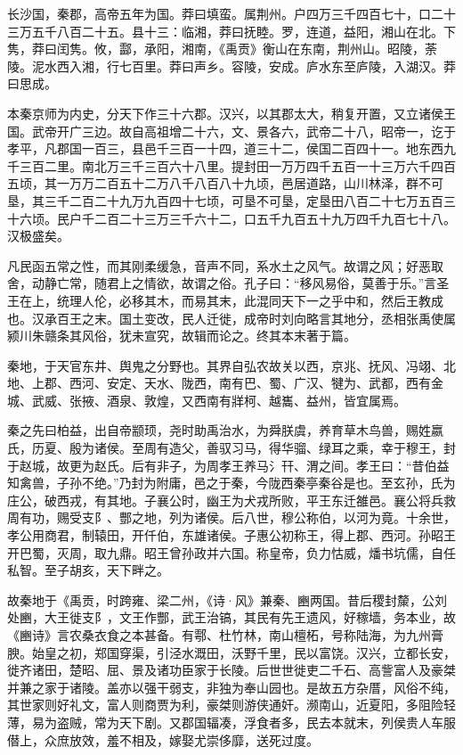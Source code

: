 \documentclass[]{article}
\begin{document}
长沙国，秦郡，高帝五年为国。莽曰填蛮。属荆州。户四万三千四百七十，口二十三万五千八百二十五。县十三：临湘，莽曰抚睦。罗，连道，益阳，湘山在北。下隽，莽曰闰隽。攸，酃，承阳，湘南，《禹贡》衡山在东南，荆州山。昭陵，荼陵。泥水西入湘，行七百里。莽曰声乡。容陵，安成。庐水东至庐陵，入湖汉。莽曰思成。

本秦京师为内史，分天下作三十六郡。汉兴，以其郡太大，稍复开置，又立诸侯王国。武帝开广三边。故自高祖增二十六，文、景各六，武帝二十八，昭帝一，讫于孝平，凡郡国一百三，县邑千三百一十四，道三十二，侯国二百四十一。地东西九千三百二里。南北万三千三百六十八里。提封田一万万四千五百一十三万六千四百五顷，其一万万二百五十二万八千八百八十九顷，邑居道路，山川林泽，群不可垦，其三千二百二十九万九百四十七顷，可垦不可垦，定垦田八百二十七万五百三十六顷。民户千二百二十三万三千六十二，口五千九百五十九万四千九百七十八。汉极盛矣。

凡民函五常之性，而其刚柔缓急，音声不同，系水土之风气。故谓之风；好恶取舍，动静亡常，随君上之情欲，故谓之俗。孔子曰：``移风易俗，莫善于乐。''言圣王在上，统理人伦，必移其木，而易其末，此混同天下一之乎中和，然后王教成也。汉承百王之末。国土变改，民人迁徙，成帝时刘向略言其地分，丞相张禹使属颍川朱赣条其风俗，犹未宣究，故辑而论之。终其本末著于篇。

秦地，于天官东井、舆鬼之分野也。其界自弘农故关以西，京兆、抚风、冯翊、北地、上郡、西河、安定、天水、陇西，南有巴、蜀、广汉、犍为、武都，西有金城、武威、张掖、酒泉、敦煌，又西南有牂柯、越巂、益州，皆宜属焉。

秦之先曰柏益，出自帝颛顼，尧时助禹治水，为舜朕虞，养育草木鸟兽，赐姓嬴氏，历夏、殷为诸侯。至周有造父，善驭习马，得华骝、绿耳之乘，幸于穆王，封于赵城，故更为赵氏。后有非子，为周孝王养马氵幵、渭之间。孝王曰：``昔伯益知禽兽，子孙不绝。''乃封为附庸，邑之于秦，今陇西秦亭秦谷是也。至玄孙，氏为庄公，破西戎，有其地。子襄公时，幽王为犬戎所败，平王东迁雒邑。襄公将兵救周有功，赐受支阝、酆之地，列为诸侯。后八世，穆公称伯，以河为竟。十余世，孝公用商君，制辕田，开仟伯，东雄诸侯。子惠公初称王，得上郡、西河。孙昭王开巴蜀，灭周，取九鼎。昭王曾孙政并六国。称皇帝，负力怙威，燔书坑儒，自任私智。至子胡亥，天下畔之。

故秦地于《禹贡，时跨雍、梁二州，《诗·风》兼秦、豳两国。昔后稷封斄，公刘处豳，大王徙支阝，文王作酆，武王治镐，其民有先王遗风，好稼墙，务本业，故《豳诗》言农桑衣食之本甚备。有鄠、杜竹林，南山檀柘，号称陆海，为九州膏腴。始皇之初，郑国穿渠，引泾水溉田，沃野千里，民以富饶。汉兴，立都长安，徙齐诸田，楚昭、屈、景及诸功臣家于长陵。后世世徙吏二千石、高訾富人及豪桀并兼之家于诸陵。盖亦以强干弱支，非独为奉山园也。是故五方杂厝，风俗不纯，其世家则好礼文，富人则商贾为利，豪桀则游侠通奸。濒南山，近夏阳，多阻险轻薄，易为盗贼，常为天下剧。又郡国辐凑，浮食者多，民去本就末，列侯贵人车服僣上，众庶放效，羞不相及，嫁娶尤崇侈靡，送死过度。
\end{document}
